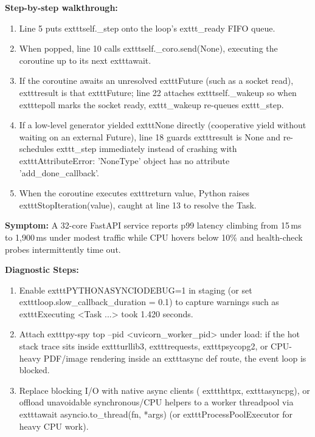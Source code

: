 \textbf{Step-by-step walkthrough:}
\begin{enumerate}[leftmargin=15pt]
  \item Line 5 puts 	exttt{self.\_step} onto the loop's 	exttt{\_ready} FIFO queue.
  \item When popped, line 10 calls 	exttt{self.\_coro.send(None)}, executing the coroutine up to its next 	exttt{await}.
  \item If the coroutine awaits an unresolved 	exttt{Future} (such as a socket read), 	exttt{result} is that 	exttt{Future}; line 22 attaches 	exttt{self.\_wakeup} so when 	exttt{epoll} marks the socket ready, 	exttt{\_wakeup} re-queues 	exttt{\_step}.
  \item If a low-level generator yielded 	exttt{None} directly (cooperative yield without waiting on an external Future), line 18 guards 	exttt{result is None} and re-schedules 	exttt{\_step} immediately instead of crashing with 	exttt{AttributeError: 'NoneType' object has no attribute 'add\_done\_callback'}.
  \item When the coroutine executes 	exttt{return value}, Python raises 	exttt{StopIteration(value)}, caught at line 13 to resolve the Task.
\end{enumerate}

\begin{realworldbox}
\textbf{Symptom:} A 32-core FastAPI service reports p99 latency climbing from 15\,ms to 1,900\,ms under modest traffic while CPU hovers below 10\% and health-check probes intermittently time out.

\textbf{Diagnostic Steps:}
\begin{enumerate}[leftmargin=15pt,itemsep=2pt]
  \item Enable 	exttt{PYTHONASYNCIODEBUG=1} in staging (or set 	exttt{loop.slow\_callback\_duration = 0.1}) to capture warnings such as 	exttt{Executing <Task ...> took 1.420 seconds}.
  \item Attach 	exttt{py-spy top --pid <uvicorn\_worker\_pid>} under load: if the hot stack trace sits inside 	exttt{urllib3}, 	exttt{requests}, 	exttt{psycopg2}, or CPU-heavy PDF/image rendering inside an 	exttt{async def} route, the event loop is blocked.
  \item Replace blocking I/O with native async clients (	exttt{httpx}, 	exttt{asyncpg}), or offload unavoidable synchronous/CPU helpers to a worker threadpool via 	exttt{await asyncio.to\_thread(fn, *args)} (or 	exttt{ProcessPoolExecutor} for heavy CPU work).
\end{enumerate}
\end{realworldbox}

